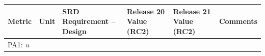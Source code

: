 \documentclass[DM,toc]{lsstdoc}
\begin{document}
\begin{longtable}[]{@{}llllll@{}}
\toprule
\begin{minipage}[b]{0.12\columnwidth}\raggedright\strut
Metric\strut
\end{minipage} & \begin{minipage}[b]{0.06\columnwidth}\raggedright\strut
Unit\strut
\end{minipage} & \begin{minipage}[b]{0.14\columnwidth}\raggedright\strut
SRD Requirement -- Design\strut
\end{minipage} & \begin{minipage}[b]{0.12\columnwidth}\raggedright\strut
Release 20 Value (RC2) \strut
\end{minipage} & \begin{minipage}[b]{0.12\columnwidth}\raggedright\strut
Release 21 Value (RC2) \strut
\end{minipage} & \begin{minipage}[b]{0.17\columnwidth}\raggedright\strut
Comments\strut
\end{minipage}\tabularnewline
\midrule
\endhead
\begin{minipage}[t]{0.12\columnwidth}\raggedright\strut
PA1: \emph{u}\strut
\end{minipage} & \begin{minipage}[t]{0.06\columnwidth}\raggedright\strut

\end{minipage}
\end{longtable}
\end{document}
